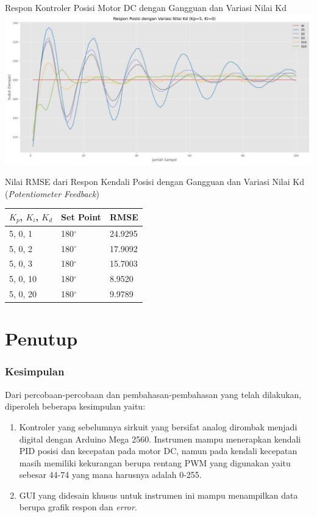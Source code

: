 \documentclass[10pt,xcolor={dvipsnames}]{beamer}
\begin{document}
\begin{frame}{Respon Kontroler Posisi Motor DC dengan Gangguan dan Variasi Nilai Kd}
	\centering
	\includegraphics[width=14cm]{Graph/VariasiD.png}
\end{frame}
\begin{frame}{Nilai RMSE dari Respon Kendali Posisi dengan Gangguan dan Variasi Nilai Kd (\textit{Potentiometer Feedback})}
	\begin{table}[H] 
		\begin{tabular}{| m{3cm} | m{3cm}| m{3cm}|}
			\hline
			\textbf{$K_{p}$, $K_{i}$, $K_{d}$}	& \textbf{Set Point}	& \textbf{RMSE}\\
			\hline 
			5, 0, 1	& 180$^\circ$			& 24.9295\\
			5, 0, 2 & 180$^\circ$			& 17.9092\\
			5, 0, 3 & 180$^\circ$			& 15.7003\\
			5, 0, 10 & 180$^\circ$			& 8.9520\\
			5, 0, 20 & 180$^\circ$			& 9.9789\\
			\hline
		\end{tabular}
	\end{table}
\end{frame}

\section{Penutup}
		\begin{frame}
			\frametitle{Kesimpulan}
			Dari percobaan-percobaan dan pembahasan-pembahasan yang telah dilakukan, diperoleh beberapa kesimpulan yaitu:
			\begin{enumerate}
				\item Kontroler yang sebelumnya sirkuit yang bersifat analog dirombak menjadi digital dengan Arduino Mega 2560. Instrumen mampu menerapkan kendali PID posisi dan kecepatan pada motor DC, namun pada kendali kecepatan masih memiliki kekurangan berupa rentang PWM yang digunakan yaitu sebesar 44-74 yang mana harusnya adalah 0-255.
				\item GUI yang didesain khusus untuk instrumen ini mampu menampilkan data berupa grafik respon dan \textit{error}.
			\end{enumerate}
		\end{frame}
		
\end{document}
